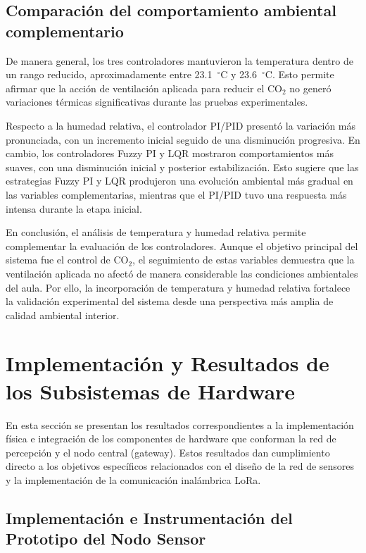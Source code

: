 \subsection{Comparación del comportamiento ambiental complementario}

De manera general, los tres controladores mantuvieron la temperatura dentro de un rango reducido, aproximadamente entre 23.1~\(^\circ\)C y 23.6~\(^\circ\)C. Esto permite afirmar que la acción de ventilación aplicada para reducir el CO\(_2\) no generó variaciones térmicas significativas durante las pruebas experimentales.

Respecto a la humedad relativa, el controlador PI/PID presentó la variación más pronunciada, con un incremento inicial seguido de una disminución progresiva. En cambio, los controladores Fuzzy PI y LQR mostraron comportamientos más suaves, con una disminución inicial y posterior estabilización. Esto sugiere que las estrategias Fuzzy PI y LQR produjeron una evolución ambiental más gradual en las variables complementarias, mientras que el PI/PID tuvo una respuesta más intensa durante la etapa inicial.

En conclusión, el análisis de temperatura y humedad relativa permite complementar la evaluación de los controladores. Aunque el objetivo principal del sistema fue el control de CO\(_2\), el seguimiento de estas variables demuestra que la ventilación aplicada no afectó de manera considerable las condiciones ambientales del aula. Por ello, la incorporación de temperatura y humedad relativa fortalece la validación experimental del sistema desde una perspectiva más amplia de calidad ambiental interior.

\section{Implementación y Resultados de los Subsistemas de Hardware}

En esta sección se presentan los resultados correspondientes a la implementación física e integración de los componentes de hardware que conforman la red de percepción y el nodo central (gateway). Estos resultados dan cumplimiento directo a los objetivos específicos relacionados con el diseño de la red de sensores y la implementación de la comunicación inalámbrica LoRa.

\subsection{Implementación e Instrumentación del Prototipo del Nodo Sensor}

